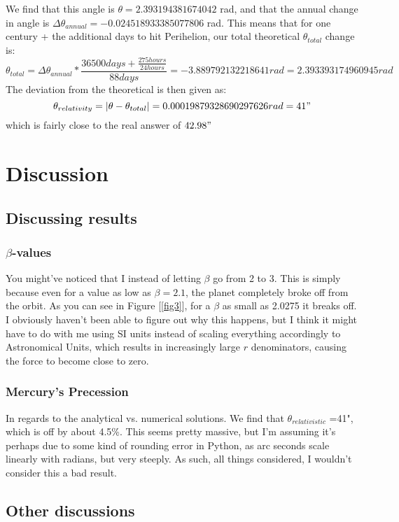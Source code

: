\documentclass{article}
\begin{document}
We find that this angle is $\theta = 2.393194381674042$ rad, and that the annual change in angle is $\Delta \theta_{annual} = -0.024518933385077806$ rad. This means that for one century + the additional days to hit Perihelion, our total theoretical $\theta_{total}$ change is:
\begin{equation*}
    \theta_{total} = \Delta \theta_{annual}*\frac{36500 days + \frac{275 hours}{24 hours}}{88 days} = -3.889792132218641 rad = 2.393393174960945 rad
\end{equation*}
The deviation from the theoretical is then given as:
\begin{equation*}
    \theta_{relativity} = \left |\theta - \theta_{total}\right| = 0.00019879328690297626 rad = 41"
\end{equation*}
which is fairly close to the real answer of $42.98"$
\section{Discussion}
\subsection*{Discussing results}
\subsubsection*{$\beta$-values}
You might've noticed that I instead of letting $\beta$ go from 2 to 3. This is simply because even for a value as low as $\beta = 2.1$, the planet completely broke off from the orbit. As you can see in Figure [\ref{fig3}], for a $\beta$ as small as 2.0275 it breaks off. I obviously haven't been able to figure out why this happens, but I think it might have to do with me using SI units instead of scaling everything accordingly to Astronomical Units, which results in increasingly large $r$ denominators, causing the force to become close to zero.
\subsubsection*{Mercury's Precession}
In regards to the analytical vs. numerical solutions. We find that $\theta_{relativistic}$ =41", which is off by about 4.5\%. This seems pretty massive, but I'm assuming it's perhaps due to some kind of rounding error in Python, as arc seconds scale linearly with radians, but very steeply. As such, all things considered, I wouldn't consider this a bad result.
\newpage
\subsection*{Other discussions}
\end{document}
